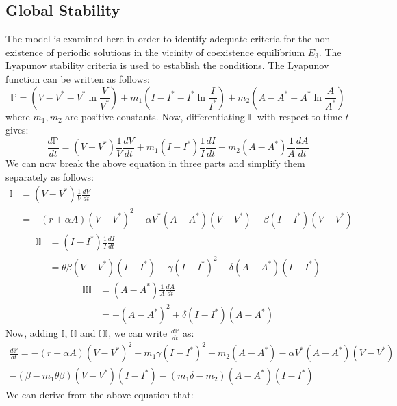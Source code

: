 \documentclass[12pt]{article}
\numberwithin{equation}{section}
\begin{document}
\subsection{Global Stability}
The model is examined here in order to identify adequate criteria for the non-existence of periodic solutions in the vicinity of coexistence equilibrium $E_3$. The Lyapunov stability criteria is used to establish the conditions.
The Lyapunov function can be written as follows:
\begin{equation}\label{sec3:e36}
\mathbb P = (V-V^*-V^*\ln\frac{V}{V^*})+m_1(I-I^*-I^*\ln\frac{I}{I^*})+m_2(A-A^*-A^*\ln\frac{A}{A^*})
\end{equation}
where $m_1,m_2$ are positive constants. Now, differentiating $\mathbb L$ with respect to time $t$ gives:
\begin{equation}\label{sec3:e37}
\frac{d\mathbb P}{dt}=(V-V^*)\frac{1}{V}\frac{dV}{dt} + m_1(I-I^*)\frac{1}{I}\frac{dI}{dt} + m_2 (A-A^*)\frac{1}{A}\frac{dA}{dt}
\end{equation}
We can now break the above equation in three parts and simplify them separately as follows:
\begin{align}\label{sec3:e38}
\mathbb I &=(V-V^*)\frac{1}{V}\frac{dV}{dt}\\
               &=-(r+\alpha A)(V-V^*)^2-\alpha V^*(A-A^*)(V-V^*)-\beta(I-I^*)(V-V^*)
\end{align}
\begin{align}\label{sec3:e39}
\mathbb {II} &=(I-I^*)\frac{1}{I}\frac{dI}{dt}\\
                   &=\theta\beta(V-V^*)(I-I^*)-\gamma(I-I^*)^2-\delta(A-A^*)(I-I^*)
\end{align}
\begin{align}\label{sec3:e40}
\mathbb {III} &=(A-A^*)\frac{1}{A}\frac{dA}{dt}\\
                    &=-(A-A^*)^2+\delta(I-I^*)(A-A^*)
\end{align}
Now, adding $\mathbb I$, $\mathbb{II}$ and $\mathbb{III}$, we can write $\frac{d \mathbb P}{dt}$ as:
\begin{equation}\label{sec3:e41}
\begin{split}
\frac{d\mathbb P}{dt} = -(r+\alpha A)(V-V^*)^2 - m_1\gamma(I-I^*)^2-m_2(A-A^*)-\alpha V^*(A-A^*)(V-V^*)\\ - (\beta-m_1\theta\beta)(V-V^*)(I-I^*) - (m_1\delta-m_2)(A-A^*)(I-I^*)
\end{split}
\end{equation}
We can derive from the above equation that:
\end{document}
